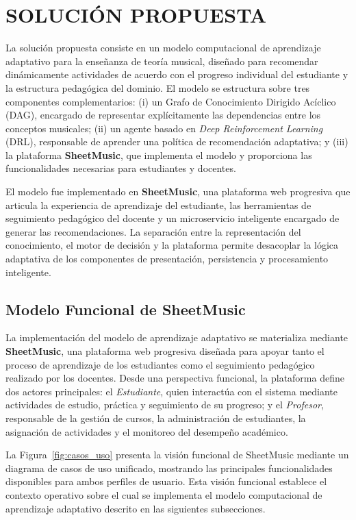 \section{SOLUCIÓN PROPUESTA}

La solución propuesta consiste en un modelo computacional de aprendizaje adaptativo para la enseñanza de teoría musical, diseñado para recomendar dinámicamente actividades de acuerdo con el progreso individual del estudiante y la estructura pedagógica del dominio. El modelo se estructura sobre tres componentes complementarios: (i) un Grafo de Conocimiento Dirigido Acíclico (DAG), encargado de representar explícitamente las dependencias entre los conceptos musicales; (ii) un agente basado en \textit{Deep Reinforcement Learning} (DRL), responsable de aprender una política de recomendación adaptativa; y (iii) la plataforma \textbf{SheetMusic}, que implementa el modelo y proporciona las funcionalidades necesarias para estudiantes y docentes.

El modelo fue implementado en \textbf{SheetMusic}, una plataforma web progresiva que articula la experiencia de aprendizaje del estudiante, las herramientas de seguimiento pedagógico del docente y un microservicio inteligente encargado de generar las recomendaciones. La separación entre la representación del conocimiento, el motor de decisión y la plataforma permite desacoplar la lógica adaptativa de los componentes de presentación, persistencia y procesamiento inteligente.

\subsection{Modelo Funcional de SheetMusic}

La implementación del modelo de aprendizaje adaptativo se materializa mediante \textbf{SheetMusic}, una plataforma web progresiva diseñada para apoyar tanto el proceso de aprendizaje de los estudiantes como el seguimiento pedagógico realizado por los docentes. Desde una perspectiva funcional, la plataforma define dos actores principales: el \textit{Estudiante}, quien interactúa con el sistema mediante actividades de estudio, práctica y seguimiento de su progreso; y el \textit{Profesor}, responsable de la gestión de cursos, la administración de estudiantes, la asignación de actividades y el monitoreo del desempeño académico.

La Figura~\ref{fig:casos_uso} presenta la visión funcional de SheetMusic mediante un diagrama de casos de uso unificado, mostrando las principales funcionalidades disponibles para ambos perfiles de usuario. Esta visión funcional establece el contexto operativo sobre el cual se implementa el modelo computacional de aprendizaje adaptativo descrito en las siguientes subsecciones.

